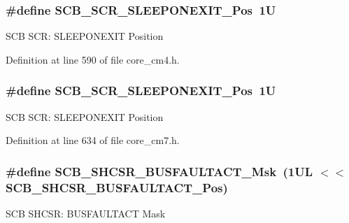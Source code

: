 \subsubsection[{\texorpdfstring{S\+C\+B\+\_\+\+S\+C\+R\+\_\+\+S\+L\+E\+E\+P\+O\+N\+E\+X\+I\+T\+\_\+\+Pos}{SCB_SCR_SLEEPONEXIT_Pos}}]{\setlength{\rightskip}{0pt plus 5cm}\#define S\+C\+B\+\_\+\+S\+C\+R\+\_\+\+S\+L\+E\+E\+P\+O\+N\+E\+X\+I\+T\+\_\+\+Pos~1U}\hypertarget{group___c_m_s_i_s___s_c_b_ga3680a15114d7fdc1e25043b881308fe9}{}\label{group___c_m_s_i_s___s_c_b_ga3680a15114d7fdc1e25043b881308fe9}
S\+CB S\+CR\+: S\+L\+E\+E\+P\+O\+N\+E\+X\+IT Position 

Definition at line 590 of file core\+\_\+cm4.\+h.

\subsubsection[{\texorpdfstring{S\+C\+B\+\_\+\+S\+C\+R\+\_\+\+S\+L\+E\+E\+P\+O\+N\+E\+X\+I\+T\+\_\+\+Pos}{SCB_SCR_SLEEPONEXIT_Pos}}]{\setlength{\rightskip}{0pt plus 5cm}\#define S\+C\+B\+\_\+\+S\+C\+R\+\_\+\+S\+L\+E\+E\+P\+O\+N\+E\+X\+I\+T\+\_\+\+Pos~1U}\hypertarget{group___c_m_s_i_s___s_c_b_ga3680a15114d7fdc1e25043b881308fe9}{}\label{group___c_m_s_i_s___s_c_b_ga3680a15114d7fdc1e25043b881308fe9}
S\+CB S\+CR\+: S\+L\+E\+E\+P\+O\+N\+E\+X\+IT Position 

Definition at line 634 of file core\+\_\+cm7.\+h.

\subsubsection[{\texorpdfstring{S\+C\+B\+\_\+\+S\+H\+C\+S\+R\+\_\+\+B\+U\+S\+F\+A\+U\+L\+T\+A\+C\+T\+\_\+\+Msk}{SCB_SHCSR_BUSFAULTACT_Msk}}]{\setlength{\rightskip}{0pt plus 5cm}\#define S\+C\+B\+\_\+\+S\+H\+C\+S\+R\+\_\+\+B\+U\+S\+F\+A\+U\+L\+T\+A\+C\+T\+\_\+\+Msk~(1\+U\+L $<$$<$ S\+C\+B\+\_\+\+S\+H\+C\+S\+R\+\_\+\+B\+U\+S\+F\+A\+U\+L\+T\+A\+C\+T\+\_\+\+Pos)}\hypertarget{group___c_m_s_i_s___s_c_b_ga9d7a8b1054b655ad08d85c3c535d4f73}{}\label{group___c_m_s_i_s___s_c_b_ga9d7a8b1054b655ad08d85c3c535d4f73}
S\+CB S\+H\+C\+SR\+: B\+U\+S\+F\+A\+U\+L\+T\+A\+CT Mask 

